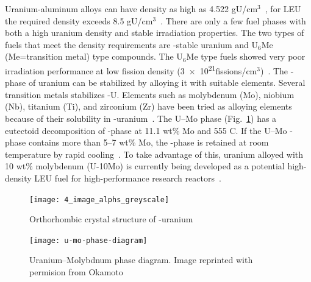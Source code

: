 Uranium-aluminum alloys can have density as high as 4.522 gU/cm$^3$~\cite{saller1956study}, for LEU the required density exceeds 8.5 gU/cm$^3$~\cite{sannen2014}. There are only a few fuel phases with both a high uranium density and stable irradiation properties. The two types of fuels that meet the density requirements are \textgamma-stable uranium and U$_6$Me (Me=transition metal) type compounds. The U$_6$Me type fuels showed very poor irradiation performance at low fission density (\num{3e21}fissions/cm$^3$)~\cite{meyer2000irradiation, hofman1987irradiation, vandenberghe2010}. The \textgamma-phase of uranium can be stabilized by alloying it with suitable elements. Several transition metals stabilizes \textgamma-U. Elements such as molybdenum (Mo), niobium (Nb), titanium (Ti), and zirconium (Zr) have been tried as alloying elements because of their solubility in \textgamma-uranium~\cite{donze1959stabilisation,giraud1973formation,lopes2013mechanical}. The U--Mo phase (Fig.~\ref{fig:umophase}) has a eutectoid decomposition of \textgamma-phase at 11.1 wt\% Mo and 555 \textdegree C. If the U--Mo \textgamma-phase contains more than 5--7 wt\% Mo, the \textgamma-phase is retained at room temperature by rapid cooling~\cite{saller1954transformation, bostrom1957}.
 To take advantage of this, uranium alloyed with 10 wt$\%$ molybdenum (U-10Mo) is currently being developed as a potential high-density LEU fuel for high-performance research reactors~\cite{prabhakaran2017u, meyer2014irradiation, williams2017post}. 

\begin{figure}
\centering
\texttt{[image: 4\_image\_alphs\_greyscale]}
\caption{Orthorhombic crystal structure of \textalpha-uranium}
\end{figure}



\begin{figure}
\centering
\texttt{[image: u-mo-phase-diagram]}
\caption[U--Mo phase diagram]{Uranium--Molybdnum phase diagram. Image reprinted with permision from Okamoto~\cite{okamoto2012mo}}
\label{fig:umophase}
\end{figure}

